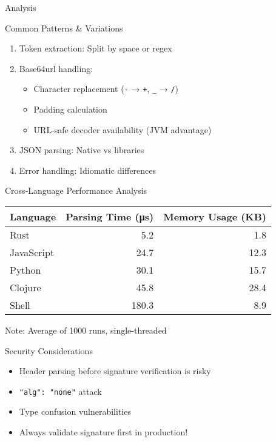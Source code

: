 \documentclass[presentation,aspectratio=169]{beamer}
\begin{document}
\begin{frame}[label={sec:org6e27c17},fragile]{Analysis}
 \begin{block}{Common Patterns \& Variations}
\begin{enumerate}[<+->]
\item \alert{Token extraction}: Split by space or regex
\item \alert{Base64url handling}:
\begin{itemize}
\item Character replacement (\texttt{-} → \texttt{+}, \texttt{\_} → \texttt{/})
\item Padding calculation
\item URL-safe decoder availability (JVM advantage)
\end{itemize}
\item \alert{JSON parsing}: Native vs libraries
\item \alert{Error handling}: Idiomatic differences
\end{enumerate}
\end{block}
\begin{block}{Cross-Language Performance Analysis}
\begin{center}
\begin{tabular}{lrr}
Language & Parsing Time (μs) & Memory Usage (KB)\\
\hline
Rust & 5.2 & 1.8\\
JavaScript & 24.7 & 12.3\\
Python & 30.1 & 15.7\\
Clojure & 45.8 & 28.4\\
Shell & 180.3 & 8.9\\
\end{tabular}
\end{center}

\alert{Note: Average of 1000 runs, single-threaded}
\end{block}
\begin{block}{Security Considerations}
\begin{itemize}[<+->]
\item Header parsing before signature verification is risky
\item \texttt{"alg": "none"} attack
\item Type confusion vulnerabilities
\item Always validate signature first in production!
\end{itemize}
\end{block}
\end{frame}
\end{document}
